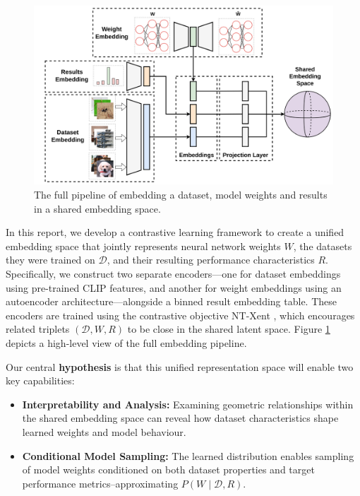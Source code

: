 \begin{figure}[!t]
    \centering
    \includegraphics[width=0.75\linewidth]{pipeline.png}
    \caption[The full pipeline of embedding a dataset, model weights and results in a shared embedding space.]{The full pipeline of embedding a dataset, model weights and results in a shared embedding space. }
    \label{fig:pipeline}
\end{figure}

In this report, we develop a contrastive learning framework to create a unified embedding space that jointly represents neural network weights \( W \), the datasets they were trained on \( \mathcal{D} \), and their resulting performance characteristics \( R \). Specifically, we construct two separate encoders—one for dataset embeddings using pre-trained CLIP features, and another for weight embeddings using an autoencoder architecture—alongside a binned result embedding table. These encoders are trained using the contrastive objective NT-Xent \cite{agren2022ntxentlossupperbound}, which encourages related triplets \( (\mathcal{D}, W, R) \) to be close in the shared latent space. Figure \ref{fig:pipeline} depicts a high-level view of the full embedding pipeline.
\newpage

Our central \textbf{hypothesis} is that this unified representation space will enable two key capabilities:

\begin{itemize}
    \item \textbf{Interpretability and Analysis:} Examining geometric relationships within the shared embedding space can reveal how dataset characteristics shape learned weights and model behaviour.
    \item \textbf{Conditional Model Sampling:} The learned distribution enables sampling of model weights conditioned on both dataset properties and target performance metrics--approximating \( P(W \mid \mathcal{D}, R) \).
\end{itemize}


